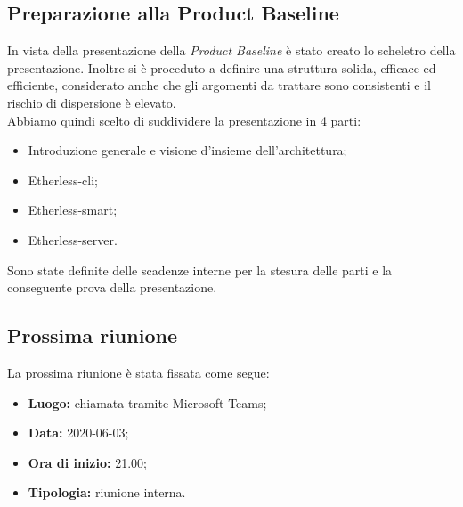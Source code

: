 	\subsection{Preparazione alla Product Baseline}
		In vista della presentazione della \textit{Product Baseline} è stato creato lo scheletro della presentazione. Inoltre si è proceduto a definire una struttura solida, efficace ed efficiente, considerato anche che gli argomenti da trattare sono consistenti e il rischio di dispersione è elevato.\\
		Abbiamo quindi scelto di suddividere la presentazione in 4 parti:
		\begin{itemize}
			\item Introduzione generale e visione d'insieme dell'architettura;
			\item Etherless-cli;
			\item Etherless-smart;
			\item Etherless-server.
		\end{itemize}
		Sono state definite delle scadenze interne per la stesura delle parti e la conseguente prova della presentazione.
	
	
	\subsection{Prossima riunione}
		La prossima riunione è stata fissata come segue:
		\begin{itemize}
			\item \textbf{Luogo:} chiamata tramite Microsoft Teams; 
			\item \textbf{Data:} 2020-06-03;
			\item \textbf{Ora di inizio:} 21.00;
			\item \textbf{Tipologia:} riunione interna.
		\end{itemize}